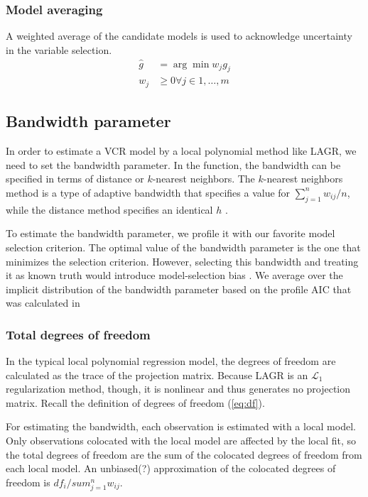 \subsubsection{Model averaging}
A weighted average of the candidate models is used to acknowledge uncertainty in the variable selection. 
\begin{align}
\hat{g} &= \arg\!\min w_j g_j \\
w_j &\geq 0 \forall j \in 1, \dots, m
\end{align}

\subsection{Bandwidth parameter}
In order to estimate a VCR model by a local polynomial method like LAGR, we need to set the bandwidth parameter. In the  function, the bandwidth can be specified in terms of distance or $k$-nearest neighbors. The $k$-nearest neighbors method is a type of adaptive bandwidth that specifies a value for $\sum_{j=1}^n w_{ij} / n$, while the distance method specifies an identical $h$ .

To estimate the bandwidth parameter, we profile it with our favorite model selection criterion. The optimal value of the bandwidth parameter is the one that minimizes the selection criterion. However, selecting this bandwidth and treating it as known truth would introduce model-selection bias \citep{model-selection-bias-refs}. We average over the implicit distribution of the bandwidth parameter based on the profile AIC that was calculated in 

\subsubsection{Total degrees of freedom}
In the typical local polynomial regression model, the degrees of freedom are calculated as the trace of the projection matrix. Because LAGR is an $\mathcal{L}_1$ regularization method, though, it is nonlinear and thus generates no projection matrix. Recall the definition of degrees of freedom (\ref{eq:df}).

For estimating the bandwidth, each observation is estimated with a local model. Only observations colocated with the local model are affected by the local fit, so the total degrees of freedom are the sum of the colocated degrees of freedom from each local model. An unbiased(?) approximation of the colocated degrees of freedom is $df_i / sum_{j=1}^n w_{ij}$.


